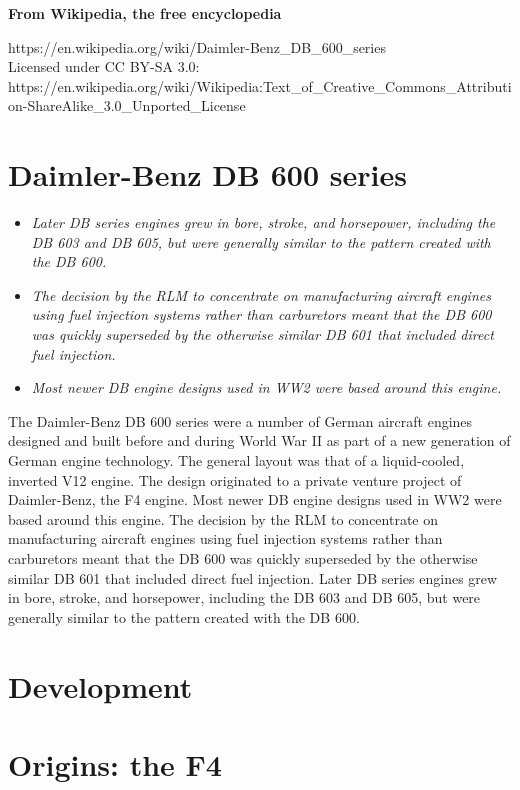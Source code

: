 \textbf{From Wikipedia, the free encyclopedia}

https://en.wikipedia.org/wiki/Daimler-Benz\_DB\_600\_series\\
Licensed under CC BY-SA 3.0:\\
https://en.wikipedia.org/wiki/Wikipedia:Text\_of\_Creative\_Commons\_Attribution-ShareAlike\_3.0\_Unported\_License

\section{Daimler-Benz DB 600 series}\label{daimler-benz-db-600-series}

\begin{itemize}
\item
  \emph{Later DB series engines grew in bore, stroke, and horsepower,
  including the DB 603 and DB 605, but were generally similar to the
  pattern created with the DB 600.}
\item
  \emph{The decision by the RLM to concentrate on manufacturing aircraft
  engines using fuel injection systems rather than carburetors meant
  that the DB 600 was quickly superseded by the otherwise similar DB 601
  that included direct fuel injection.}
\item
  \emph{Most newer DB engine designs used in WW2 were based around this
  engine.}
\end{itemize}

The Daimler-Benz DB 600 series were a number of German aircraft engines
designed and built before and during World War II as part of a new
generation of German engine technology. The general layout was that of a
liquid-cooled, inverted V12 engine. The design originated to a private
venture project of Daimler-Benz, the F4 engine. Most newer DB engine
designs used in WW2 were based around this engine. The decision by the
RLM to concentrate on manufacturing aircraft engines using fuel
injection systems rather than carburetors meant that the DB 600 was
quickly superseded by the otherwise similar DB 601 that included direct
fuel injection. Later DB series engines grew in bore, stroke, and
horsepower, including the DB 603 and DB 605, but were generally similar
to the pattern created with the DB 600.

\section{Development}\label{development}

\section{Origins: the F4}\label{origins-the-f4}

